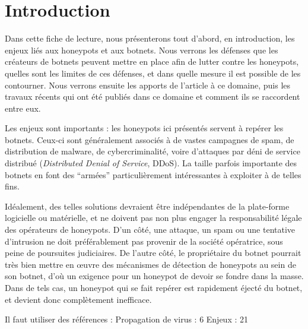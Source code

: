 \section*{Introduction}


Dans cette fiche de lecture, nous présenterons tout d'abord, en introduction, les enjeux liés aux honeypots et aux
botnets. Nous verrons les défenses que les créateurs de botnets peuvent mettre en place afin
de lutter contre les honeypots, quelles sont les limites de ces défenses, et dans quelle mesure il est possible 
de les contourner. Nous verrons ensuite les apports de l'article à ce domaine, puis les travaux récents
qui ont été publiés dans ce domaine et comment ils se raccordent entre eux.

Les enjeux sont importants : les honeypots ici présentés servent à repérer les botnets.  Ceux-ci sont généralement associés à de vastes campagnes de spam, de distribution de malware, de cybercriminalité, voire d'attaques par déni de service distribué (\textit{Distributed Denial of Service}, DDoS).  La taille parfois importante des botnets en font des ``armées'' particulièrement intéressantes à exploiter à de telles fins.

Idéalement, des telles solutions devraient être indépendantes de la plate-forme logicielle ou matérielle, et ne doivent pas non plus engager la responsabilité légale des opérateurs de honeypots.  D'un côté, une attaque, un spam ou une tentative d'intrusion ne doit préférablement pas provenir de la société opératrice, sous peine de poursuites judiciaires. De l'autre côté, le propriétaire du botnet pourrait très bien mettre en œuvre des mécanismes de détection de honeypots au sein de son botnet, d'où un exigence pour un honeypot de devoir se fondre dans la masse.  Dans de tels cas, un honeypot qui se fait repérer est rapidement éjecté du botnet, et devient donc complètement inefficace.


Il faut utiliser des références :
Propagation de virus : 6
Enjeux : 21
